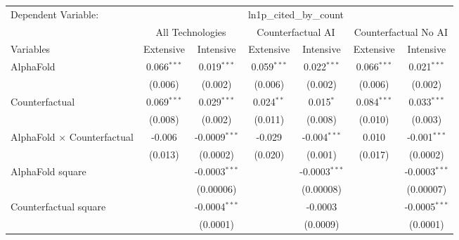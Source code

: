 \begingroup
\centering
\begin{tabular}{lcccccc}
   \tabularnewline \midrule \midrule
   Dependent Variable: & \multicolumn{6}{c}{ln1p\_cited\_by\_count}\\
 & \multicolumn{2}{c}{All Technologies} & \multicolumn{2}{c}{Counterfactual AI} & \multicolumn{2}{c}{Counterfactual No AI} \\
\cmidrule(lr){1-1}\cmidrule(lr){2-3} \cmidrule(lr){4-5} \cmidrule(lr){6-7}
Variables & \multicolumn{1}{c}{Extensive} & \multicolumn{1}{c}{Intensive} & \multicolumn{1}{c}{Extensive} & \multicolumn{1}{c}{Intensive} & \multicolumn{1}{c}{Extensive} & \multicolumn{1}{c}{Intensive} \\
\cmidrule(lr){1-1}\cmidrule(lr){2-2} \cmidrule(lr){3-3} \cmidrule(lr){4-4} \cmidrule(lr){5-5} \cmidrule(lr){6-6} \cmidrule(lr){7-7}
   AlphaFold                          & 0.066$^{***}$ & 0.019$^{***}$     & 0.059$^{***}$ & 0.022$^{***}$    & 0.066$^{***}$ & 0.021$^{***}$\\   
                                      & (0.006)       & (0.002)           & (0.006)       & (0.002)          & (0.006)       & (0.002)\\   
   Counterfactual                     & 0.069$^{***}$ & 0.029$^{***}$     & 0.024$^{**}$  & 0.015$^{*}$      & 0.084$^{***}$ & 0.033$^{***}$\\   
                                      & (0.008)       & (0.002)           & (0.011)       & (0.008)          & (0.010)       & (0.003)\\   
   AlphaFold $\times$ Counterfactual  & -0.006        & -0.0009$^{***}$   & -0.029        & -0.004$^{***}$   & 0.010         & -0.001$^{***}$\\   
                                      & (0.013)       & (0.0002)          & (0.020)       & (0.001)          & (0.017)       & (0.0002)\\   
   AlphaFold square                   &               & -0.0003$^{***}$   &               & -0.0003$^{***}$  &               & -0.0003$^{***}$\\   
                                      &               & (0.00006)         &               & (0.00008)        &               & (0.00007)\\   
   Counterfactual square              &               & -0.0004$^{***}$   &               & -0.0003          &               & -0.0005$^{***}$\\   
                                      &               & (0.0001)          &               & (0.0009)         &               & (0.0001)\\   

\end{tabular}
